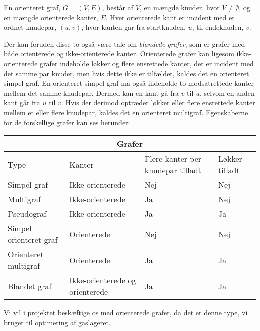 \begin{defn}  
En orienteret graf, $G=(V,E)$, består af $V$, en mængde knuder, hvor $V \neq \emptyset$, og en mængde orienterede kanter, $E$. Hver orienterede kant er incident med et ordnet knudepar, $(u,v)$, hvor kanten går fra startknuden, $u$, til endeknuden, $v$. 
\end{defn}



Der kan foruden disse to også være tale om \emph{blandede grafer}, som er grafer med både orienterede og ikke-orienterede kanter. Orienterede grafer kan ligesom ikke-orienterede grafer indeholde løkker og flere ensrettede kanter, der er incident med det samme par knuder, men hvis dette ikke er tilfældet, kaldes det en orienteret simpel graf. En orienteret simpel graf må også indeholde to modsatrettede kanter mellem det samme knudepar. Dermed kan en kant gå fra $v$ til $u$, selvom en anden kant går fra $u$ til $v$. Hvis der derimod optræder løkker eller flere ensrettede kanter mellem et eller flere knudepar, kaldes det en orienteret multigraf.  
Egenskaberne for de forskellige grafer kan ses herunder:


\begin{center} \label{tab:typer}
\begin{tabular}{ |p{4cm}|p{3cm}|p{3cm}|p{2cm}|  }
 \hline
 \multicolumn{4}{|c|}{Grafer} \\
 \hline
 Type & Kanter & Flere kanter per knudepar tilladt & Løkker tilladt\\
 \hline
 Simpel graf   & Ikke-orienterede    & Nej &   Nej\\
 Multigraf &   Ikke-orienterede & Ja   & Nej\\
 Pseudograf & Ikke-orienterede & Ja &  Ja\\
 Simpel orienteret graf    & Orienterede & Nej &  Nej\\
 Orienteret multigraf &  Orienterede  & Ja & Ja\\
 Blandet graf & Ikke-orienterede og orienterede  & Ja   & Ja\\
 \hline
\end{tabular}
\end{center}

%

Vi vil i projektet beskæftige os med orienterede grafer, da det er denne type, vi bruger til optimering af gaslageret. 
